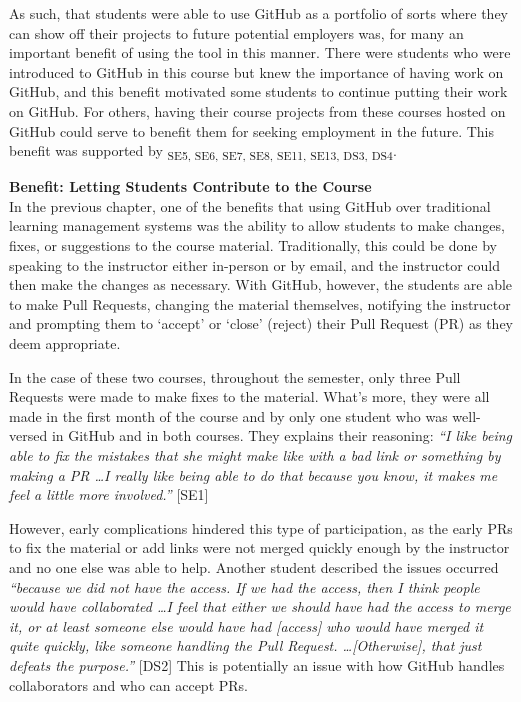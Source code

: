 As such, that students were able to use GitHub as a portfolio of sorts where they can show off their projects to future potential employers was, for many an important benefit of using the tool in this manner. There were students who were introduced to GitHub in this course but knew the importance of having work on GitHub, and this benefit motivated some students to continue putting their work on GitHub. For others, having their course projects from these courses hosted on GitHub could serve to benefit them for seeking employment in the future. This benefit was supported by \textsubscript{SE5, SE6, SE7, SE8, SE11, SE13, DS3, DS4}.

\textbf{Benefit: Letting Students Contribute to the Course} \\ %
In the previous chapter, one of the benefits that using GitHub over traditional learning management systems was the ability to allow students to make changes, fixes, or suggestions to the course material. Traditionally, this could be done by speaking to the instructor either in-person or by email, and the instructor could then make the changes as necessary. With GitHub, however, the students are able to make Pull Requests, changing the material themselves, notifying the instructor and prompting them to `accept' or `close' (reject) their Pull Request (PR) as they deem appropriate.

In the case of these two courses, throughout the semester, only three Pull Requests were made to make fixes to the material. What's more, they were all made in the first month of the course and by only one student who was well-versed in GitHub and in both courses. They explains their reasoning: \textit{``I like being able to fix the mistakes that she might make like with a bad link or something by making a PR \ldots I really like being able to do that because you know, it makes me feel a little more involved.''} [SE1]

However, early complications hindered this type of participation, as the early PRs to fix the material or add links were not merged quickly enough by the instructor and no one else was able to help. Another student described the issues occurred \textit{``because we did not have the access. If we had the access, then I think people would have collaborated \ldots I feel that either we should have had the access to merge it, or at least someone else would have had [access] who would have merged it quite quickly, like someone handling the Pull Request. \ldots [Otherwise], that just defeats the purpose.''} [DS2] This is potentially an issue with how GitHub handles collaborators and who can accept PRs.

